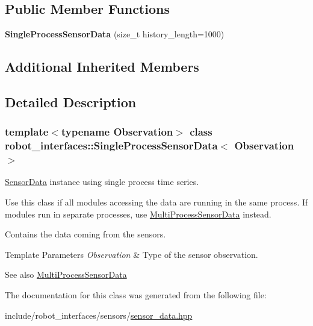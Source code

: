 \subsection*{Public Member Functions}
\begin{DoxyCompactItemize}
\item 
\mbox{\label{classrobot__interfaces_1_1SingleProcessSensorData_acebc7e34620a9adb3d80f82ea9da6836}} 
{\bfseries Single\+Process\+Sensor\+Data} (size\+\_\+t history\+\_\+length=1000)
\end{DoxyCompactItemize}
\subsection*{Additional Inherited Members}


\subsection{Detailed Description}
\subsubsection*{template$<$typename Observation$>$\newline
class robot\+\_\+interfaces\+::\+Single\+Process\+Sensor\+Data$<$ Observation $>$}

\hyperlink{classrobot__interfaces_1_1SensorData}{Sensor\+Data} instance using single process time series. 

Use this class if all modules accessing the data are running in the same process. If modules run in separate processes, use \hyperlink{classrobot__interfaces_1_1MultiProcessSensorData}{Multi\+Process\+Sensor\+Data} instead.

Contains the data coming from the sensors. 
\begin{DoxyTemplParams}{Template Parameters}
{\em Observation} & Type of the sensor observation. \\
\hline
\end{DoxyTemplParams}
\begin{DoxySeeAlso}{See also}
\hyperlink{classrobot__interfaces_1_1MultiProcessSensorData}{Multi\+Process\+Sensor\+Data} 
\end{DoxySeeAlso}


The documentation for this class was generated from the following file\+:\begin{DoxyCompactItemize}
\item 
include/robot\+\_\+interfaces/sensors/\hyperlink{sensor__data_8hpp}{sensor\+\_\+data.\+hpp}\end{DoxyCompactItemize}
